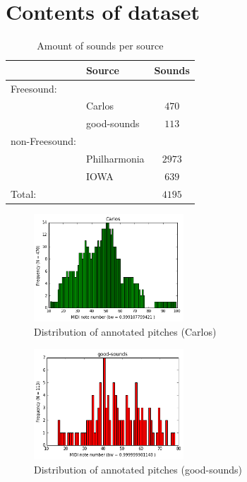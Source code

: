 \documentclass{proc}
\begin{document}
\section{Contents of dataset}
\begin{table}[h]
    \begin{center}
        \begin{tabular}{ | l | l | c |}
            \hline
                            &   Source      &   Sounds  \\  \hline  
            Freesound:      &               &           \\  \hline
                            &   Carlos      &   $470$   \\  \hline
                            &   good-sounds &   $113$   \\  \hline
            non-Freesound:  &               &           \\  \hline
                            &   Philharmonia&   $2973$  \\  \hline
                            &   IOWA        &   $639$   \\  \hline
            \hline
            Total:          &               &   $4195$  \\  \hline
        \end{tabular}
        \caption{Amount of sounds per source}
        \label{table:snds_amount}
    \end{center}
\end{table}
\begin{figure}
    \centering
    \includegraphics[width=0.5\textwidth]{img/distr_cs.png}
    \caption{Distribution of annotated pitches (Carlos)}
    \label{fig:cs_d}
\end{figure}
\begin{figure}
    \centering
    \includegraphics[width=0.5\textwidth]{img/distr_gs.png}
    \caption{Distribution of annotated pitches (good-sounds)}
    \label{fig:gs_d}
\end{figure}
\end{document}

